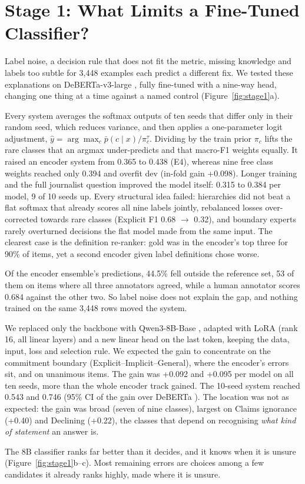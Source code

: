 \section{Stage 1: What Limits a Fine-Tuned Classifier?}
\label{sec:classifier}
\FigureStageOne

Label noise, a decision rule that does not fit the metric, missing knowledge and labels too subtle for 3,448 examples each predict a different fix.
We tested these explanations on DeBERTa-v3-large \citep{he2023debertav3}, fully fine-tuned with a nine-way head, changing one thing at a time against a named control (Figure~\ref{fig:stage1}a).

Every system averages the softmax outputs of ten seeds that differ only in their random seed, which reduces variance, and then applies a one-parameter logit adjustment, $\hat y = \arg\max_c \bar p(c \mid x)/\pi_c^{\tau}$.
Dividing by the train prior $\pi_c$ lifts the rare classes that an argmax under-predicts and that macro-F1 weights equally. It raised an encoder system from 0.365 to 0.438 (E4), whereas nine free class weights reached only 0.394 and overfit dev (in-fold gain +0.098).
Longer training and the full journalist question improved the model itself: 0.315 to 0.384 per model, 9 of 10 seeds up.
Every structural idea failed: hierarchies did not beat a flat softmax that already scores all nine labels jointly, rebalanced losses over-corrected towards rare classes (Explicit F1 0.68 $\rightarrow$ 0.32), and boundary experts rarely overturned decisions the flat model made from the same input.
The clearest case is the definition re-ranker: gold was in the encoder's top three for 90\% of items, yet a second encoder given label definitions chose worse.

Of the encoder ensemble's predictions, 44.5\% fell outside the reference set, 53 of them on items where all three annotators agreed, while a human annotator scores 0.684 against the other two.
So label noise does not explain the gap, and nothing trained on the same 3,448 rows moved the system.

We replaced only the backbone with Qwen3-8B-Base \citep{qwen3}, adapted with LoRA \citep{hu2022lora} (rank 16, all linear layers) and a new linear head on the last token, keeping the data, input, loss and selection rule.
We expected the gain to concentrate on the commitment boundary (Explicit--Implicit--General), where the encoder's errors sit, and on unanimous items.
The gain was +0.092 \Stwo{} and +0.095 \Sone{} per model on all ten seeds, more than the whole encoder track gained. The 10-seed system reached 0.543 \Stwo{} and 0.746 \Sone{} (95\% CI of the gain over DeBERTa ).
The location was not as expected: the gain was broad (seven of nine classes), largest on Claims ignorance (+0.40) and Declining (+0.22), the classes that depend on recognising \emph{what kind of statement} an answer is.

The 8B classifier ranks far better than it decides, and it knows when it is unsure (Figure~\ref{fig:stage1}b--c).
Most remaining errors are choices among a few candidates it already ranks highly, made where it is unsure.
